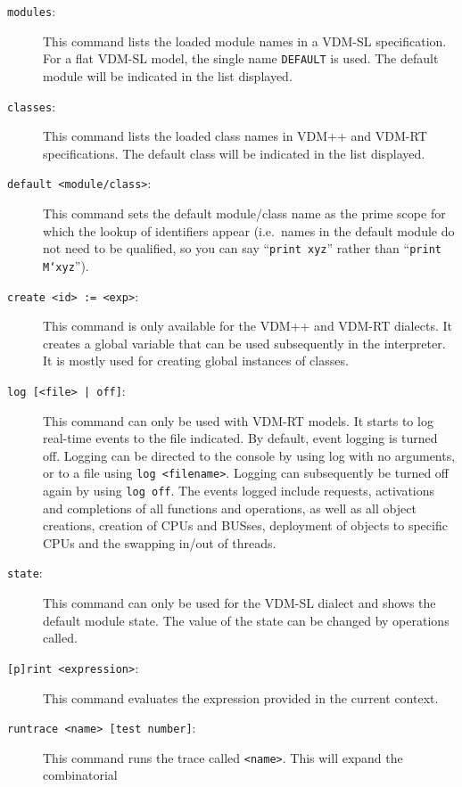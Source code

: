 \documentclass{overturerepchap}
\begin{document}
\begin{description}
\item[\texttt{modules}:] This command lists the loaded module names in
  a VDM-SL specification. For a flat VDM-SL model, the single name
  \texttt{DEFAULT} is used. The default module will be indicated in
  the list displayed.
\item[\texttt{classes}:] This command lists the loaded class names in
  VDM++ and VDM-RT specifications. The default class will be indicated in
  the list displayed.
\item[\texttt{default <module/class>}:] This command sets the default
  module/class name as the prime scope for which the lookup of
  identifiers appear (i.e.\ names in the default module
  do not need to be qualified, so you can say ``\texttt{print xyz}'' rather than
``\texttt{print M`xyz}'').
\item[\texttt{create <id> := <exp>}:] This command is only available
  for the VDM++ and VDM-RT dialects. It creates a global variable that
  can be used subsequently in the interpreter. It is mostly used for
  creating global instances of classes.
\item[\texttt{log [<file> | off]}:] This command can only be used with
  VDM-RT models. It starts to log real-time events to the file indicated. By
  default, event logging is turned off. Logging can be directed to
  the console by using log with no arguments, or to a file using \texttt{log
  <filename>}. Logging can subsequently be turned off again by using
  \texttt{log off}. The events logged include requests, activations and
  completions of all functions and operations, as well as all object creations,
  creation of CPUs and BUSses, deployment of objects
  to specific CPUs and the swapping in/out of threads.
\item[\texttt{state}:] This command can only be used for the VDM-SL
  dialect and shows the default module state.
  The value of the state can be changed by operations called.
\item[\texttt{[p]rint <expression>}:] This command evaluates the
  expression provided in the current context.
\item[\texttt{runtrace <name> [test number]}:] This command runs the trace called
  \texttt{<name>}. This will expand the combinatorial

\end{description}
\end{document}
